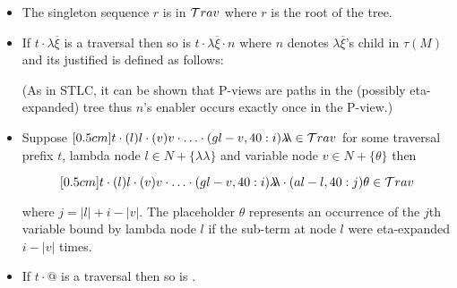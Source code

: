 \documentclass{article}
\theoremstyle{definition}
\newcommand\Nodes{N}%
\newcommand{\ghostlmd}{{\lambda\!\!\lambda}}
\newcommand{\ghostvar}{\theta}
\begin{document}
\begin{FramedTable}
\begin{itemize}[]
\item{} The singleton sequence $r$ is in $\mathcal{T}rav$ where $r$ is the root of the tree.
\end{itemize}

\begin{itemize}[]
    \item {} If $t \cdot \lambda \overline{\xi}$ is a traversal then so is
        $t \cdot \lambda \overline{\xi} \cdot n$ where $n$
        denotes $\lambda \overline{\xi}$'s child in $\tau(M)$ and its justified is defined as follows:
            (As in STLC, it can be shown that P-views  are paths in the (possibly eta-expanded) tree thus $n$'s enabler occurs exactly once in the P-view.)
    
    \item \rulenamet{Lam^\ghostlmd} Suppose
  $\Pstr[0.5cm]{ t \cdot(l){l} \cdot
(v){v} \cdot \ldots \cdot 
(gl-v,40:i){\ghostlmd} \in\travset}$ for some traversal prefix $t$, lambda node $l \in \Nodes + \{ \ghostlmd \}$ and variable node $v \in \Nodes + \{ \ghostvar\}$ then
    
    
$$\Pstr[0.5cm]{ t \cdot(l){l} \cdot
(v){v} 
\cdot \ldots \cdot 
(gl-v,40:i){\ghostlmd}\cdot (al-l,40:j){\ghostvar}
     \in\travset}$$

     where $j = |l| + i - |v|$. The placeholder $\ghostvar$ represents an occurrence of the $j$th variable bound by lambda node $l$ if the sub-term at node $l$ were eta-expanded $i-|v|$ times.


    \item {} If $t \cdot @$ is a traversal then so is .
\end{itemize}


\end{FramedTable}
\end{document}
